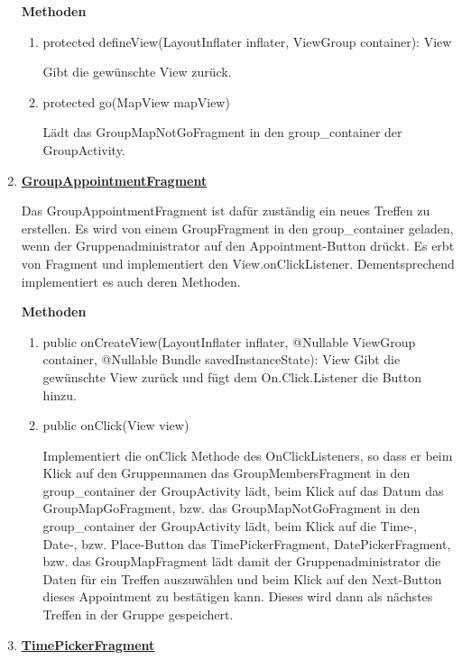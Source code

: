 \begin{enumerate}
	\textbf{Methoden}
	\begin{enumerate}
		\item protected defineView(LayoutInflater inflater, ViewGroup container): View

		Gibt die gewünschte View zurück.

		\item protected go(MapView mapView)

		Lädt das GroupMapNotGoFragment in den group\_container der GroupActivity.

	\end{enumerate}

	\item \textbf{\underline{GroupAppointmentFragment}}

	Das GroupAppointmentFragment ist dafür zuständig ein neues Treffen zu erstellen. Es wird von einem GroupFragment in den group\_container geladen, wenn der Gruppenadministrator auf den Appointment-Button drückt. Es erbt von Fragment und implementiert den View.onClickListener. Dementsprechend implementiert es auch deren Methoden.
	
	\textbf{Methoden}
	\begin{enumerate}
		\item public onCreateView(LayoutInflater inflater, @Nullable ViewGroup container, @Nullable Bundle savedInstanceState): View
			Gibt die gewünschte View zurück und fügt dem On.Click.Listener die Button hinzu.
			
		\item public onClick(View view)
		
		Implementiert die onClick Methode des OnClickListeners, so dass er beim Klick auf den Gruppennamen das GroupMembersFragment in den group\_container der GroupActivity lädt, beim Klick auf das Datum das GroupMapGoFragment, bzw. das GroupMapNotGoFragment in den group\_container der GroupActivity lädt, beim Klick auf die Time-, Date-, bzw. Place-Button das TimePickerFragment, DatePickerFragment, bzw. das GroupMapFragment lädt damit der Gruppenadministrator die Daten für ein Treffen auszuwählen und beim Klick auf den Next-Button dieses Appointment zu bestätigen kann. Dieses wird dann als nächstes Treffen in der Gruppe gespeichert.
		
	\end{enumerate}
	\item \textbf{\underline{TimePickerFragment}}


\end{enumerate}
